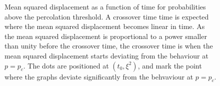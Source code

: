 \documentclass[11pt,british,a4paper]{report}
\begin{document}
\begin{figure}[H]
    \caption{Mean squared displacement as a function of time for probabilities above the percolation threshold. A crossover time time is expected where the mean squared displacement becomes linear in time. As the mean squared displacement is proportional to a power smaller than unity before the crossover time, the crossover time is when the mean squared displacement starts deviating from the behaviour at \(p=p_c\). The dots are positioned at \((t_0,\xi^2)\), and mark the point where the graphs deviate significantly from the behvaviour at \(p=p_c\).}%
    \label{fig:r2p}
\end{figure}

\nocite{*}
\printbibliography{}
\end{document}
